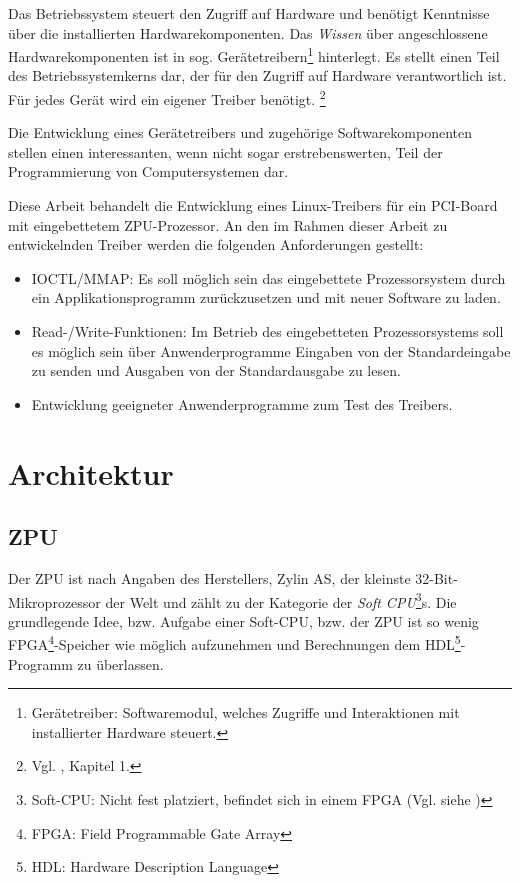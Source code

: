 \documentclass[11pt]{scrartcl}
\begin{document}
Das Betriebssystem steuert den Zugriff auf Hardware und benötigt Kenntnisse über die installierten Hardwarekomponenten. Das \textit{Wissen} über angeschlossene Hardwarekomponenten ist in sog. Gerätetreibern\footnote{Gerätetreiber: Softwaremodul, welches Zugriffe und Interaktionen mit installierter Hardware steuert.} hinterlegt. Es stellt einen Teil des Betriebssystemkerns dar, der für den Zugriff auf Hardware verantwortlich ist. Für jedes Gerät wird ein eigener Treiber benötigt. \footnote{Vgl. \cite{ltp_book}, Kapitel 1.}

Die Entwicklung eines Gerätetreibers und zugehörige Softwarekomponenten stellen einen interessanten, wenn nicht sogar erstrebenswerten, Teil der Programmierung von Computersystemen dar.

Diese Arbeit behandelt die Entwicklung eines Linux-Treibers für ein PCI-Board mit eingebettetem ZPU-Prozessor. An den im Rahmen dieser Arbeit zu entwickelnden Treiber werden die folgenden Anforderungen gestellt:

\begin{itemize}
	\item{IOCTL/MMAP: Es soll möglich sein das eingebettete Prozessorsystem durch ein Applikationsprogramm zurückzusetzen und mit neuer Software zu laden.}
	\item{Read-/Write-Funktionen: Im Betrieb des eingebetteten Prozessorsystems soll es möglich sein über Anwenderprogramme Eingaben von der Standardeingabe zu senden und Ausgaben von der Standardausgabe zu lesen.}
	\item{Entwicklung geeigneter Anwenderprogramme zum Test des Treibers.}
\end{itemize}

\pagebreak

\section{Architektur}
 
\subsection{ZPU}

Der ZPU ist nach Angaben des Herstellers, Zylin AS, der kleinste 32-Bit-Mikroprozessor der Welt und zählt zu der Kategorie der \textit{Soft CPU}\footnote{Soft-CPU: Nicht fest platziert, befindet sich in einem FPGA (Vgl. siehe \cite{soft_cpu})}s. Die grundlegende Idee, bzw. Aufgabe einer Soft-CPU, bzw. der ZPU ist so wenig FPGA\footnote{FPGA: Field Programmable Gate Array}-Speicher wie möglich aufzunehmen und Berechnungen dem HDL\footnote{HDL: Hardware Description Language}-Programm zu überlassen.
\end{document}
